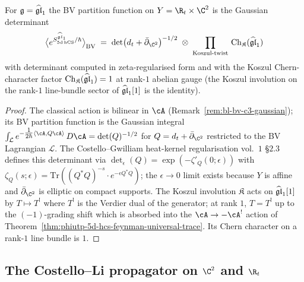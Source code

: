\begin{proposition}
\label{prop:bl-bv-gaussian-partition}
\ClaimStatusProvedHere
For $\mathfrak{g} = \widehat{\mathfrak{gl}}_1$ the BV partition function on $Y = \R_t\times\C^2$
is the Gaussian determinant
\[
  \bigl\langle e^{S_{5\mathrm{d\,hCS}}^{\ghat}/\hbar}\bigr\rangle_\BV
  \;=\;
  \det\bigl(d_t + \bar\partial_{\C^2}\bigr)^{-1/2}
  \;\otimes\;
  \prod_\text{Koszul-twist}\,\mathrm{Ch}_\mathfrak{K}(\ghat)
\]
with determinant computed in zeta-regularised form and with the
Koszul Chern-character factor $\mathrm{Ch}_{\mathfrak{K}}(\widehat{\mathfrak{gl}}_1) = 1$
at rank-$1$ abelian gauge (the Koszul involution on the rank-$1$
line-bundle sector of $\widehat{\mathfrak{gl}}_1[1]$ is the identity).
\end{proposition}

\begin{proof}
The classical action is bilinear in $\cA$ (Remark~\ref{rem:bl-bv-c3-gaussian});
its BV partition function is the Gaussian integral
$\int_\mathcal{L} e^{-\tfrac{1}{2\hbar}\langle\cA, Q\cA\rangle}\, D\cA
= \det(Q)^{-1/2}$
for $Q = d_t + \bar\partial_{\C^2}$ restricted to the BV Lagrangian
$\mathcal{L}$. The Costello--Gwilliam heat-kernel regularisation
\cite{CostelloGwilliam} vol.\ $1$ \S$2.3$ defines this determinant
via
$\det_\epsilon(Q) = \exp(-\zeta'_Q(0;\epsilon))$
with $\zeta_Q(s;\epsilon) = \mathrm{Tr}((Q^*Q)^{-s}\cdot e^{-\epsilon Q^*Q})$;
the $\epsilon\to 0$ limit exists because $Y$ is affine and
$\bar\partial_{\C^2}$ is elliptic on compact supports.
The Koszul involution $\mathfrak{K}$ acts on $\widehat{\mathfrak{gl}}_1[1]$ by
$T\mapsto T^!$ where $T^!$ is the Verdier dual of the generator; at
rank $1$, $T = T^!$ up to the $(-1)$-grading shift which is absorbed
into the $\cA\to -\cA^!$ action of Theorem~\ref{thm:phiutp-5d-hcs-feynman-universal-trace}.
Its Chern character on a rank-$1$ line bundle is $1$.
\end{proof}

\subsection*{The Costello--Li propagator on $\C^2$ and $\R_t$}


